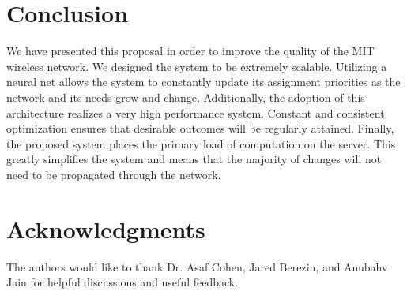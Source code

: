 \documentclass[10pt,journal,compsoc]{IEEEtran}
\begin{document}
		
		\section{Conclusion}
		We have presented this proposal in order to improve the quality of the MIT wireless network. We designed the system to be extremely scalable.  Utilizing a neural net allows the system to constantly update its assignment priorities as the network and its needs grow and change. Additionally, the adoption of this architecture realizes a very high performance system. Constant and consistent optimization ensures that desirable outcomes will be regularly attained. Finally, the proposed system places the primary load of computation on the server. This greatly simplifies the system and means that the majority of changes will not need to be propagated through the network.
		
		\section{Acknowledgments}
		The authors would like to thank Dr. Asaf Cohen, Jared Berezin, and Anubahv Jain for helpful discussions and useful feedback.
		
\end{document}
